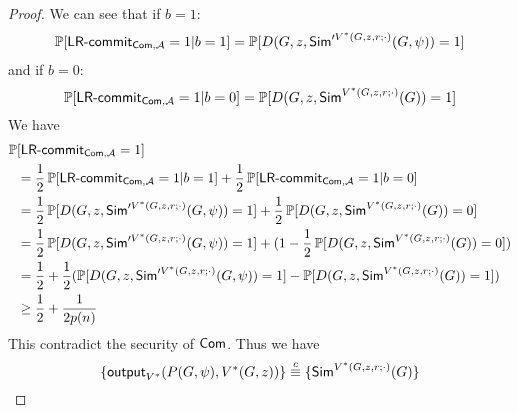 \begin{proof}
We can see that if $b=1$:
\begin{align*}
    \mathop{\mathbb P\/}[\text{\sf LR-commit}_{{\sf Com},\mathcal{A}}=1|b=1]=\mathop{\mathbb P\/}[D(G,z,{\sf Sim}'^{V^*(G,z,r;\cdot)}(G,\psi))=1]
\end{align*}
and if $b=0$:
\begin{equation*}
    \mathop{\mathbb P\/}[\text{\sf LR-commit}_{{\sf Com},\mathcal{A}}=1|b=0]=\mathop{\mathbb P\/}[D(G,z,{\sf Sim}^{V^*(G,z,r;\cdot)}(G))=1]
\end{equation*}
We have
\begin{align*}
    \mathop{\mathbb P\/}&[\text{\sf LR-commit}_{{\sf Com},\mathcal{A}}=1] \\
    &=\frac{1}{2}\mathop{\mathbb P\/}[\text{\sf LR-commit}_{{\sf Com},\mathcal{A}}=1|b=1]+\frac{1}{2}\mathop{\mathbb P\/}[\text{\sf LR-commit}_{{\sf Com},\mathcal{A}}=1|b=0] \\
    &=\frac{1}{2}\mathop{\mathbb P\/}[D(G,z,{\sf Sim}'^{V^*(G,z,r;\cdot)}(G,\psi))=1]+\frac{1}{2}\mathop{\mathbb P\/}[D(G,z,{\sf Sim}^{V^*(G,z,r;\cdot)}(G))=0] \\
    &=\frac{1}{2}\mathop{\mathbb P\/}[D(G,z,{\sf Sim}'^{V^*(G,z,r;\cdot)}(G,\psi))=1]+(1-\frac{1}{2}\mathop{\mathbb P\/}[D(G,z,{\sf Sim}^{V^*(G,z,r;\cdot)}(G))=0]) \\
    &=\frac{1}{2} + \frac{1}{2}(\mathop{\mathbb P\/}[D(G,z,{\sf Sim}'^{V^*(G,z,r;\cdot)}(G,\psi))=1]-\mathop{\mathbb P\/}[D(G,z,{\sf Sim}^{V^*(G,z,r;\cdot)}(G))=1]) \\
    &\geq\frac{1}{2}+\frac{1}{2p(n)}
\end{align*}
This contradict the security of ${\sf Com}$. Thus we have $$\{{\sf output}_{V^*}(P(G,\psi),V^*(G,z))\}\stackrel{c}{\equiv}\{{\sf Sim}^{V^*(G,z,r;\cdot)}(G)\}$$
\end{proof}